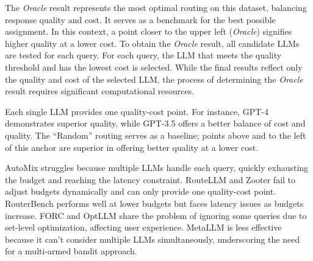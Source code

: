 
The \textit{Oracle} result represents the most optimal routing on this dataset, balancing response quality and cost. It serves as a benchmark for the best possible assignment. In this context, a point closer to the upper left (\textit{Oracle}) signifies higher quality at a lower cost. 
To obtain the \textit{Oracle} result, all candidate LLMs are tested for each query. For each query, the LLM that meets the quality threshold and has the lowest cost is selected. While the final results reflect only the quality and cost of the selected LLM, the process of determining the \textit{Oracle} result requires significant computational resources.


Each single LLM provides one quality-cost point. For instance, GPT-4 demonstrates superior quality, while GPT-3.5 offers a better balance of cost and quality. The ``Random'' routing serves as a baseline; points above and to the left of this anchor are superior in offering better quality at a lower cost.

AutoMix struggles because multiple LLMs handle each query, quickly exhausting the budget and reaching the latency constraint. RouteLLM and Zooter fail to adjust budgets dynamically and can only provide one quality-cost point. RouterBench performs well at lower budgets but faces latency issues as budgets increase. FORC and OptLLM share the problem of ignoring some queries due to set-level optimization, affecting user experience. MetaLLM is less effective because it can't consider multiple LLMs simultaneously, underscoring the need for a multi-armed bandit approach.







